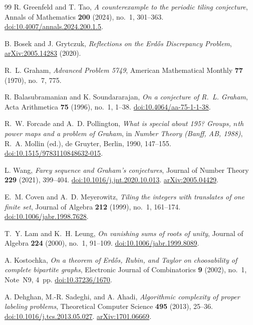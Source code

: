 \documentclass[11pt,reqno]{amsart}
\theoremstyle{definition}
\theoremstyle{remark}
\numberwithin{equation}{section}
\begin{document}
\begin{thebibliography}{99}
R. Greenfeld and T. Tao,
\emph{A counterexample to the periodic tiling conjecture},
Annals of Mathematics \textbf{200} (2024), no.~1, 301--363.
\href{https://doi.org/10.4007/annals.2024.200.1.5}{doi:10.4007/annals.2024.200.1.5}.

B. Bosek and J. Grytczuk,
\emph{Reflections on the Erd\H{o}s Discrepancy Problem},
\href{https://arxiv.org/abs/2005.14283}{arXiv:2005.14283} (2020).

R.~L. Graham,
\emph{Advanced Problem 5749},
American Mathematical Monthly \textbf{77} (1970), no.~7, 775.

R. Balasubramanian and K. Soundararajan,
\emph{On a conjecture of R.~L. Graham},
Acta Arithmetica \textbf{75} (1996), no.~1, 1--38.
\href{https://doi.org/10.4064/aa-75-1-1-38}{doi:10.4064/aa-75-1-1-38}.

R.~W. Forcade and A.~D. Pollington,
\emph{What is special about 195? Groups, $n$th power maps and a problem of Graham},
in \emph{Number Theory (Banff, AB, 1988)},
R.~A. Mollin (ed.), de Gruyter, Berlin, 1990, 147--155.
\href{https://doi.org/10.1515/9783110848632-015}{doi:10.1515/9783110848632-015}.

L. Wang,
\emph{Farey sequence and Graham's conjectures},
Journal of Number Theory \textbf{229} (2021), 399--404.
\href{https://doi.org/10.1016/j.jnt.2020.10.013}{doi:10.1016/j.jnt.2020.10.013}.
\href{https://arxiv.org/abs/2005.04429}{arXiv:2005.04429}.

E.~M. Coven and A.~D. Meyerowitz,
\emph{Tiling the integers with translates of one finite set},
Journal of Algebra \textbf{212} (1999), no.~1, 161--174.
\href{https://doi.org/10.1006/jabr.1998.7628}{doi:10.1006/jabr.1998.7628}.

T.~Y. Lam and K.~H. Leung,
\emph{On vanishing sums of roots of unity},
Journal of Algebra \textbf{224} (2000), no.~1, 91--109.
\href{https://doi.org/10.1006/jabr.1999.8089}{doi:10.1006/jabr.1999.8089}.

A. Kostochka,
\emph{On a theorem of Erd\H{o}s, Rubin, and Taylor on choosability of
complete bipartite graphs},
Electronic Journal of Combinatorics \textbf{9} (2002), no.~1, Note~N9, 4~pp.
\href{https://doi.org/10.37236/1670}{doi:10.37236/1670}.

A. Dehghan, M.-R. Sadeghi, and A. Ahadi,
\emph{Algorithmic complexity of proper labeling problems},
Theoretical Computer Science \textbf{495} (2013), 25--36.
\href{https://doi.org/10.1016/j.tcs.2013.05.027}{doi:10.1016/j.tcs.2013.05.027}.
\href{https://arxiv.org/abs/1701.06669}{arXiv:1701.06669}.

\end{thebibliography}
\end{document}
